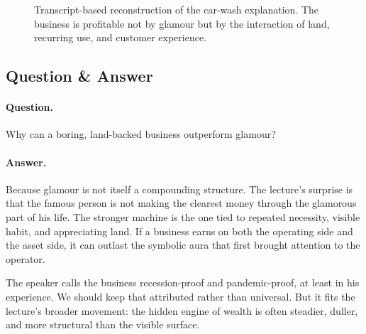 \begin{figure}[h]
\centering
{}
\caption{Transcript-based reconstruction of the car-wash explanation. The business is profitable not by glamour but by the interaction of land, recurring use, and customer experience.}
\end{figure}

\subsection{Question \& Answer}

\paragraph{Question.}
Why can a boring, land-backed business outperform glamour?

\paragraph{Answer.}
Because glamour is not itself a compounding structure. The lecture's surprise is that the famous person is not making the clearest money through the glamorous part of his life. The stronger machine is the one tied to repeated necessity, visible habit, and appreciating land. If a business earns on both the operating side and the asset side, it can outlast the symbolic aura that first brought attention to the operator.

The speaker calls the business recession-proof and pandemic-proof, at least in his experience. We should keep that attributed rather than universal. But it fits the lecture's broader movement: the hidden engine of wealth is often steadier, duller, and more structural than the visible surface.

